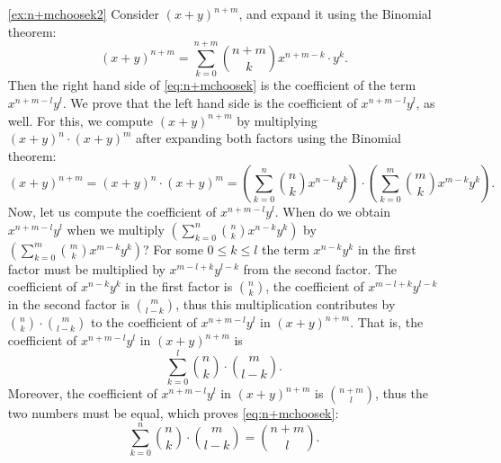 \begin{enumerate}
\item[\ref{ex:n+mchoosek2}]
Consider $(x+y)^{n+m}$, and expand it using the Binomial theorem: 
\[
(x+y)^{n+m} = \sum_{k=0}^{n+m} \binom{n+m}{k} x^{n+m-k} \cdot y^{k}. 
\]
Then the right hand side of \eqref{eq:n+mchoosek} is the coefficient of the term $x^{n+m-l}y^l$. 
We prove that the left hand side is the coefficient of $x^{n+m-l}y^l$, as well. 
For this, we compute $(x+y)^{n+m}$ by multiplying $(x+y)^n \cdot (x+y)^m$ after expanding both factors using the Binomial theorem: 
\[
(x+y)^{n+m} = (x+y)^n \cdot (x+y)^m = \left( \sum_{k=0}^n \binom{n}{k} x^{n-k}y^k \right) \cdot \left( \sum_{k=0}^m \binom{m}{k} x^{m-k}y^k \right). 
\]
Now, let us compute the coefficient of $x^{n+m-l} y^l$. 
When do we obtain $x^{n+m-l} y^l$ when we multiply $\left( \sum_{k=0}^n \binom{n}{k} x^{n-k}y^k \right)$ by $\left( \sum_{k=0}^m \binom{m}{k} x^{m-k}y^k \right)$? 
For some $0\leq k\leq l$ the term $x^{n-k}y^k$ in the first factor must be multiplied by $x^{m-l+k} y^{l-k}$ from the second factor. 
The coefficient of $x^{n-k}y^k$ in the first factor is $\binom{n}{k}$, the coefficient of $x^{m-l+k}y^{l-k}$ in the second factor is $\binom{m}{l-k}$, 
thus this multiplication contributes by $\binom{n}{k} \cdot \binom{m}{l-k}$ to the coefficient of $x^{n+m-l} y^l $ in $(x+y)^{n+m}$. 
That is, the coefficient of $x^{n+m-l} y^l$ in $(x+y)^{n+m}$ is 
\[
\sum_{k=0}^l \binom{n}{k} \cdot \binom{m}{l-k}. 
\]
Moreover, the coefficient of $x^{n+m-l}y^l$ in $(x+y)^{n+m}$ is $\binom{n+m}{l}$, thus the two numbers must be equal, 
which proves \eqref{eq:n+mchoosek}: 
\[
\sum_{k=0}^n \binom{n}{k} \cdot \binom{m}{l-k} = \binom{n+m}{l}. 
\]


\end{enumerate}
